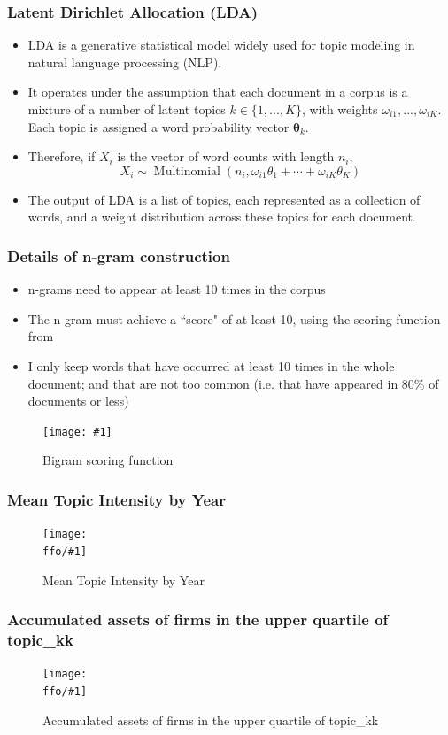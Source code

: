 \documentclass{beamer}
\newcommand{\ffo}{dicfullmc10thr10defnob40noa1_4t}
\newcommand{\insertfigurenoffo}[3]{
\begin{figure}[h!]
  \centering
  \texttt{[image: \#1]}
  \caption{#2}
  \label{fig:#1}
\end{figure}
}
\newcommand{\insertfigure}[2]{
\begin{figure}[h!]
  \centering
  \texttt{[image: \\ffo/\#1]}
  \centering
  \captionsetup{font=scriptsize}
  \caption{#2}
  \label{fig:#1}
\end{figure}
}
\begin{document}
\begin{frame}
\frametitle{Latent Dirichlet Allocation (LDA)}
\label{slide:lda}
\begin{itemize}
\small
\item LDA is a generative statistical model widely used for topic modeling in natural language processing (NLP).
\item It operates under the assumption that each document in a corpus is a mixture of a number of latent topics $k \in \{1, ..., K\}$, with weights $\omega_{i1}, ..., \omega_{iK}$. Each topic is assigned a word probability vector $\mathbf{\theta}_k$. 
\item Therefore, if $X_i$ is the vector of word counts with length $n_i$, 
\begin{equation}
X_i \sim \operatorname{Multinomial}\left(n_i, \omega_{i 1} \theta_1+\cdots+\omega_{i K} \theta_K\right)
\end{equation}
\item The output of LDA is a list of topics, each represented as a collection of words, and a weight distribution across these topics for each document.
\end{itemize}
\end{frame}

\begin{frame}
\frametitle{Details of n-gram construction}
\label{slide:ngram_details}
\begin{itemize}
\item n-grams need to appear at least 10 times in the corpus
\item The n-gram must achieve a ``score" of at least 10, using the scoring function from \cite{Mikolov2013-be} \hyperlink{slide:ngram_main}{}
\item I only keep words that have occurred at least 10 times in the whole document; and that are not too common (i.e. that have appeared in 80\% of documents or less)
\end{itemize}
\insertfigurenoffo{mikolov_formula}{Bigram scoring function}{0.3}
\end{frame}

\begin{frame}
\frametitle{Mean Topic Intensity by Year}
\label{slide:meantiy_details}
\hyperlink{results}{}
\insertfigure{mean_tiy}{Mean Topic Intensity by Year}
\end{frame}

\begin{frame}
\label{slide:acc_ntile4kk}
\frametitle{Accumulated assets of firms in the upper quartile of topic\_kk}
\insertfigure{stackedplot_at}{Accumulated assets of firms in the upper quartile of topic\_kk}
\end{frame}
\end{document}
